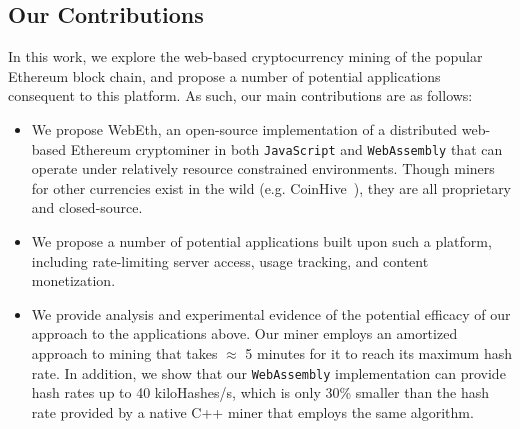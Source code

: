 \documentclass[runningheads]{llncs}
\newcommand{\trishita}[1]{}%
\begin{document}
\subsection{Our Contributions}
In this work, we explore the web-based cryptocurrency mining of the popular Ethereum block chain, \trishita{Add citation}
and propose a number of potential applications consequent to this platform.  As such, our main contributions are as follows:
\begin{itemize}
\item We propose WebEth, an open-source implementation of a distributed web-based Ethereum cryptominer in both \verb|JavaScript| and \verb|WebAssembly| that can operate under relatively resource constrained environments. Though miners for other currencies exist in the wild (e.g. CoinHive~\cite{coinhive}), they are all proprietary and closed-source.
\item We propose a number of potential applications built upon such a platform, including rate-limiting server access, usage tracking, and content monetization.
\item We provide analysis and experimental evidence of the potential efficacy of our approach to the applications above. \trishita{I feel like this next part is repetitive}Our miner employs an amortized approach to mining that takes $\approx$ 5 minutes for it to reach its maximum hash rate. In addition, we show that our \verb|WebAssembly| implementation can provide hash rates up to 40 kiloHashes/s, which is only 30\% smaller than the hash rate provided by a native C++ miner that employs the same algorithm. 
\end{itemize}

\end{document}
